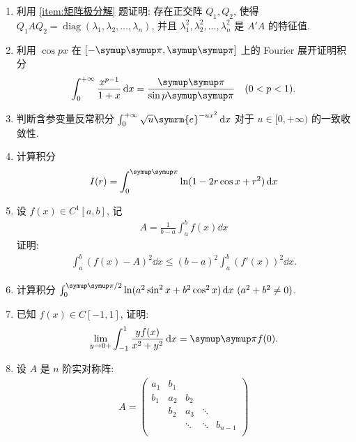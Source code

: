 \documentclass{ctexart}
\let\umathpi\pi
\renewcommand\pi{\symup\umathpi}%
\let\le\leqslant
\newcommand{\limit}[2]{\lim_{#1 \to #2}}
\newcommand{\me}{\symrm{e}}
\DeclareMathOperator{\diag}{diag}
\begin{document}
    \begin{enumerate}[resume=exer]
        \item 利用 \ref{item:矩阵极分解} 题证明: 存在正交阵 $ Q_{1}, Q_{2} $, 使得 $ Q_{1} A Q_{2} = \diag(\lambda_{1}, \lambda_{2}, \dots, \lambda_{n}) $, 并且 $ \lambda_{1}^{2}, \lambda_{2}^{2}, \dots, \lambda_{n}^{2} $ 是 $ A'A $ 的特征值. 
        \item 利用 $ \cos px $ 在 $ [-\pi, \pi] $ 上的 Fourier 展开证明积分 
        \begin{align*}
            \int_{0}^{+\infty} \frac{x^{p-1}}{1+x} \dd{x} = \frac{\pi}{\sin p\pi}\quad (0<p<1).
        \end{align*}
        \item 判断含参变量反常积分 $ \int_{0}^{+\infty}\sqrt{u}\me^{-ux^{2}} \dd{x} $ 对于 $ u \in [0, +\infty) $ 的一致收敛性. 
        \item 计算积分
        \begin{align*}
            I(r) = \int_{0}^{\pi} \ln(1 - 2r\cos x + r^{2}) \dd{x}
        \end{align*}
        \item 设 $ f(x)\in C^{1}[a, b] $, 记
        \begin{align*}
            A = \frac{1}{b - a}\int_{a}^{b} f(x) \dd{x}
        \end{align*}
        证明:
        \begin{align*}
            \int_{a}^{b}(f(x) - A)^{2} \dd{x} \le (b-a)^{2} \int_{a}^{b} (f'(x))^{2} \dd{x}.
        \end{align*}
        \item 计算积分 $ \int_{0}^{\pi/2} \ln(a^{2}\sin^{2}x + b^{2}\cos^{2} x)\dd{x}\,(a^{2} + b^{2} \ne 0) $.
        \item 已知 $ f(x) \in C[-1, 1] $, 证明:
        \begin{align*}
            \limit{y}{0+} \int_{-1}^{1}\frac{yf(x)}{x^{2} + y^{2}} \dd{x} = \pi f(0).
        \end{align*}
        \item 设 $ A $ 是 $ n $ 阶实对称阵:
        \begin{align*}
            A = \begin{pmatrix}
                a_{1} & b_{1} & & & \\
                b_{1} & a_{2} & b_{2} & & \\
                & b_{2} & a_{3} & \ddots & \\
                & & \ddots & \ddots & b_{n-1} \\

\end{pmatrix}
\end{align*}
\end{enumerate}
\end{document}
